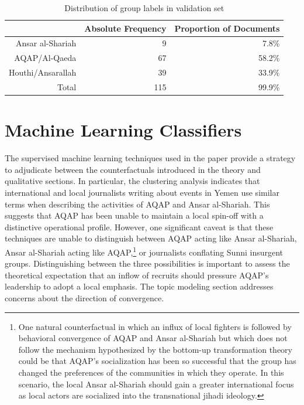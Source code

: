  \begin{table}[ht]
\centering
 \begin{tabular}{rrr}
   \hline
  & Absolute Frequency & Proportion of Documents \\
   \hline
   Ansar al-Shariah & 9 &  7.8\% \\
   AQAP/Al-Qaeda & 67 & 58.2\% \\
   Houthi/Ansarallah & 39 & 33.9\% \\
   Total & 115 & 99.9\% \\
    \hline
 \end{tabular}
 \caption{Distribution of group labels in validation set}
 \label{tab:val}
\end{table}
 
\section{Machine Learning Classifiers}                                                                            
The supervised machine learning techniques used in the paper provide a strategy to adjudicate between the counterfactuals introduced in the theory and qualitative sections. In particular, the clustering analysis indicates that international and local journalists writing
about events in Yemen use similar terms when describing the activities of AQAP and Ansar al-Shariah. This suggests that AQAP has been unable to maintain a local spin-off with a distinctive operational profile. However, one significant caveat is that these techniques are unable to distinguish between AQAP acting like Ansar al-Shariah, Ansar al-Shariah acting like AQAP,\footnote{One natural counterfactual in which an influx of local
  fighters is followed by behavioral convergence of AQAP and Ansar
  al-Shariah but which does not follow the mechanism hypothesized by
  the bottom-up transformation theory could be that AQAP’s
  socialization has been so successful that the group has changed the
  preferences of the communities in which they operate. In this
  scenario, the local Ansar al-Shariah should gain a greater
  international focus as local actors are socialized into the
  transnational jihadi ideology.} or journalists conflating Sunni insurgent
groups. Distinguishing between the three possibilities is important to
assess the theoretical expectation that an inflow of recruits should
pressure AQAP’s leadership to adopt a local emphasis. The topic
modeling section addresses concerns about the direction of convergence.

